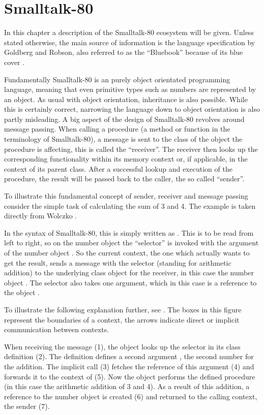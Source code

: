 \chapter{Smalltalk-80}\label{cha:chapter3}
In this chapter a description of the Smalltalk-80 ecosystem will be given. 
Unless stated otherwise, the main source of information is the language specification by Goldberg and Robson, also referred to as the \enquote{Bluebook} because of its blue cover \cite{bluebook1983}.

Fundamentally Smalltalk-80 is an purely object orientated programming language, meaning that even primitive types such as numbers are represented by an object. 
As usual with object orientation, inheritance is also possible.
While this is certainly correct, narrowing the language down to object orientation is also partly misleading. 
A big aspect of the design of Smalltalk-80 revolves around message passing. 
When calling a procedure (a method or function in the terminology of Smalltalk-80), a message is sent to the class of the object the procedure is affecting, this is called the \enquote{receiver}.
The receiver then looks up the corresponding functionality within its memory context or, if applicable, in the context of its parent class.
After a successful lookup and execution of the procedure, the result will be passed back to the caller, the so called \enquote{sender}. 

To illustrate this fundamental concept of sender, receiver and message passing consider the simple task of calculating the sum of 3 and 4. 
The example is taken directly from Wolczko \cite{Wolczko1984}.

In the syntax of Smalltalk-80, this is simply written as .
This is to be read from left to right, so on the number object  the \enquote{selector} \stcode{+} is invoked with the argument of the number object .
So the current context, the one which actually wants to get the result, sends a message with the selector \stcode{+} (standing for arithmetic addition) to the underlying class object for the receiver, in this case the number object . 
The selector \stcode{+} also takes one argument, which in this case is a reference to the object . 

To illustrate the following explanation further, see . The boxes in this figure represent the boundaries of a context, the arrows indicate direct or implicit communication between contexts.

When receiving the message (1), the object  looks up the selector in its class definition (2). 
The definition defines a second argument , the second number for the addition. The implicit call (3) fetches the reference of this argument (4) and forwards it to the context of  (5).
Now the object  performs the defined procedure (in this case the arithmetic addition of 3 and 4). 
As a result of this addition, a reference to the number object  is created (6) and returned to the calling context, the sender (7). 

